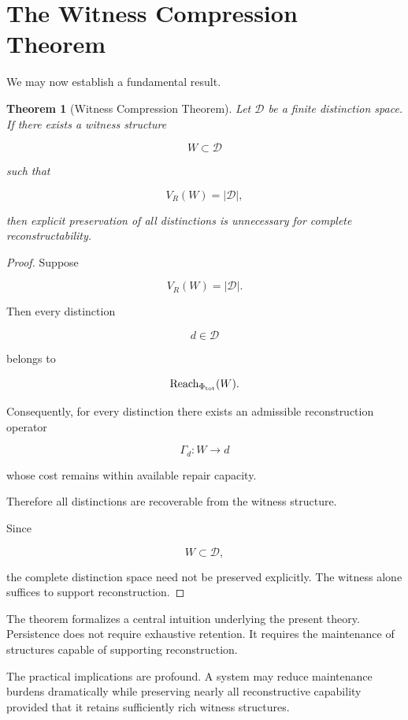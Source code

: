 \documentclass[12pt,oneside]{book}
\theoremstyle{plain} \newtheorem{theorem}{Theorem}[chapter] \newtheorem{lemma}[theorem]{Lemma} \newtheorem{proposition}[theorem]{Proposition} \newtheorem{corollary}[theorem]{Corollary}
\theoremstyle{definition} \newtheorem{definition}[theorem]{Definition} \newtheorem{axiom}[theorem]{Axiom} \newtheorem{construction}[theorem]{Construction}
\theoremstyle{remark} \newtheorem{remark}[theorem]{Remark} \newtheorem{example}[theorem]{Example}
\newcommand{\D}{\mathcal{D}} \newcommand{\R}{\mathcal{R}} \newcommand{\F}{\mathcal{F}} \newcommand{\U}{\mathcal{U}} \newcommand{\M}{\mathcal{M}} \newcommand{\G}{\Gamma}
\begin{document}
\section{The Witness Compression Theorem}

We may now establish a fundamental result.

\begin{theorem}[Witness Compression Theorem]

Let $\D$ be a finite distinction space. If there exists a witness structure

\[
W
\subset
\D
\]

such that

\[
V_R(W)
=
|\D|,
\]

then explicit preservation of all distinctions is unnecessary for complete reconstructability.

\end{theorem}

\begin{proof}

Suppose

\[
V_R(W)
=
|\D|.
\]

Then every distinction

\[
d\in\D
\]

belongs to

\[
\operatorname{Reach}_{\Phi_{\mathrm{tot}}}(W).
\]

Consequently, for every distinction there exists an admissible reconstruction operator

\[
\Gamma_d
:
W
\rightarrow
d
\]

whose cost remains within available repair capacity.

Therefore all distinctions are recoverable from the witness structure.

Since

\[
W
\subset
\D,
\]

the complete distinction space need not be preserved explicitly. The witness alone suffices to support reconstruction.

\end{proof}

The theorem formalizes a central intuition underlying the present theory. Persistence does not require exhaustive retention. It requires the maintenance of structures capable of supporting reconstruction.

The practical implications are profound. A system may reduce maintenance burdens dramatically while preserving nearly all reconstructive capability provided that it retains sufficiently rich witness structures.
\end{document}
